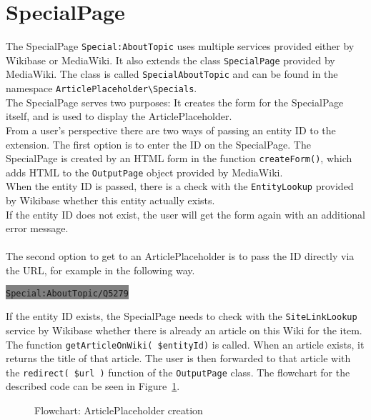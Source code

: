 \section{SpecialPage}

The SpecialPage \texttt{\justify Special:AboutTopic} uses multiple services provided either by Wikibase or MediaWiki. It also extends the class \texttt{\justify SpecialPage} provided by MediaWiki. The class is called \texttt{\justify SpecialAboutTopic} and can be found in the namespace \texttt{\justify ArticlePlaceholder\textbackslash{}Specials}. \\
The SpecialPage serves two purposes: It creates the form for the SpecialPage itself, and is used to display the ArticlePlaceholder. \\
From a user's perspective there are two ways of passing an entity ID to the extension. 
The first option is to enter the ID on the SpecialPage. The SpecialPage is created by an HTML form in the function \texttt{\justify createForm()}, which adds HTML to the \texttt{\justify OutputPage} object provided by MediaWiki. \\
When the entity ID is passed, there is a check with the \texttt{\justify EntityLookup} provided by Wikibase whether this entity actually exists. \\ 
If the entity ID does not exist, the user will get the form again with an additional error message. \\
\\
The second option to get to an ArticlePlaceholder is to pass the ID directly via the URL, for example in the following way.
\begin{center}
\colorbox{Gray}{\lstinline[basicstyle=\ttfamily\color{white}]|Special:AboutTopic/Q5279|}
\end{center}

If the entity ID exists, the SpecialPage needs to check with the \texttt{\justify SiteLinkLookup} service by Wikibase whether there is already an article on this Wiki for the item. The function \texttt{\justify getArticleOnWiki( \$entityId)} is called. When an article exists, it returns the title of that article. The user is then forwarded to that article with the \texttt{\justify redirect( \$url )} function of the \texttt{\justify OutputPage} class.
The flowchart for the described code can be seen in Figure~\ref{fig:createpl}. 
\begin{figure}[H]
	\centering
	
	\caption{Flowchart: ArticlePlaceholder creation}
	\label{fig:createpl}
\end{figure}

